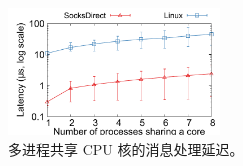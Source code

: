 \begin{figure}[htbp]
	
	\centering \includegraphics[width=0.5\textwidth]{eval/microbenchmark/sharecore-lat.pdf}
	
	\caption{多进程共享 CPU 核的消息处理延迟。}
	\label{socksdirect:fig:eval-context-switch}
\end{figure}


